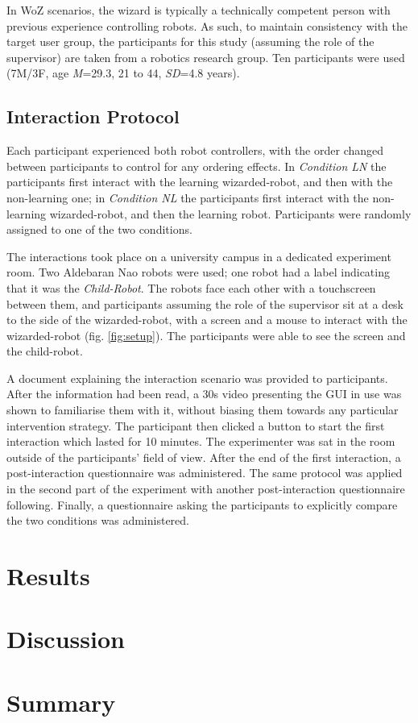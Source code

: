 In WoZ scenarios, the wizard is typically a technically competent person with previous experience controlling robots.
As such, to maintain consistency with the target user group, the participants for this study (assuming the role of the supervisor) are taken from a robotics research group.
Ten participants were used (7M/3F, age \textit{M}=29.3, 21 to 44, \textit{SD}=4.8 years).

\subsection{Interaction Protocol}

Each participant experienced both robot controllers, with the order changed between participants to control for any ordering effects.
In \textit{Condition LN} the participants first interact with the learning wizarded-robot, and then with the non-learning one; in \textit{Condition NL} the participants first interact with the non-learning wizarded-robot, and then the learning robot. 
Participants were randomly assigned to one of the two conditions.

The interactions took place on a university campus in a dedicated experiment room.
Two Aldebaran Nao robots were used; one robot had a label indicating that it was the \emph{Child-Robot}. 
The robots face each other with a touchscreen between them, and participants assuming the role of the supervisor sit at a desk to the side of the wizarded-robot, with a screen and a mouse to interact with the wizarded-robot (fig. \ref{fig:setup}).
The participants were able to see the screen and the child-robot.

A document explaining the interaction scenario was provided to participants. After the information had been read, a 30s video presenting the GUI in use was shown to familiarise them with it, without biasing them towards any particular intervention strategy.
The participant then clicked a button to start the first interaction which lasted for 10 minutes.
The experimenter was sat in the room outside of the participants' field of view.
After the end of the first interaction, a post-interaction questionnaire was administered. 
The same protocol was applied in the second part of the experiment with another post-interaction questionnaire following. Finally, a questionnaire asking the participants to explicitly compare the two conditions was administered.

\section{Results}

\section{Discussion}

\section{Summary}

